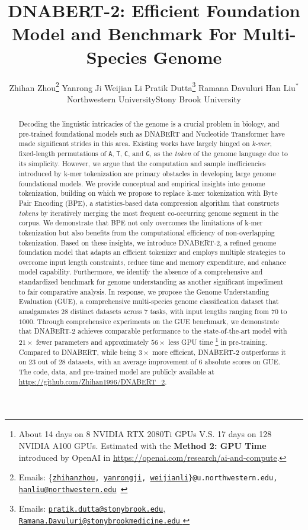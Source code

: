 \documentclass{article}
\title{DNABERT-2: Efficient Foundation Model and Benchmark For Multi-Species Genome}
\author{
  Zhihan Zhou\thanks{Emails: {\{\tt \href{mailto:zhihanzhou@u.northwestern.edu}{zhihanzhou},  \href{mailto:yanrongji2021@u.northwestern.edu}{yanrongji},    \href{mailto:weijianli@u.northwestern.edu}{weijianli}\}@u.northwestern.edu, \href{mailto:hanliu@northwestern.edu}{\texttt{hanliu@northwestern.edu}}
  }}
  \quad 
  Yanrong Ji\footnotemark[1]
  \quad
  Weijian Li\footnotemark[1]
  \quad
  Pratik Dutta\thanks{Emails: \href{mailto:pratik.dutta@stonybrook.edu}{\texttt{pratik.dutta@stonybrook.edu}, \quad \href{mailto:Ramana.Davuluri@stonybrookmedicine.edu}{\texttt{Ramana.Davuluri@stonybrookmedicine.edu}
  }}}
  \quad
  Ramana Davuluri\footnotemark[2]
  \quad
  Han Liu$^*$\\[2mm]
  Northwestern University\footnotemark[1] \qquad Stony Brook University\footnotemark[2]
}
\begin{document}
\maketitle
\setcounter{footnote}{0}  



\begin{abstract}
Decoding the linguistic intricacies  of the genome is a crucial problem in biology, and pre-trained foundational models such as DNABERT and Nucleotide Transformer have made significant strides in this area. Existing works have largely hinged on \textit{k-mer}, fixed-length permutations of \texttt{A}, \texttt{T}, \texttt{C}, and \texttt{G}, as the \textit{token} of the genome language due to its simplicity. However, we argue that the computation and sample inefficiencies introduced by k-mer tokenization are primary obstacles in developing large genome foundational models. We provide conceptual and empirical insights into genome tokenization, building on which we propose to replace k-mer tokenization with Byte Pair Encoding (BPE), a statistics-based data compression algorithm that constructs \textit{tokens} by iteratively merging the most frequent co-occurring genome segment in the corpus. We demonstrate that BPE not only overcomes the limitations of k-mer tokenization but also benefits from the computational efficiency of non-overlapping tokenization.
Based on these insights, we introduce DNABERT-2, a refined genome foundation model that adapts an efficient tokenizer and employs multiple strategies to overcome input length constraints, reduce time and memory expenditure, and enhance model capability. Furthermore, we identify the absence of a comprehensive and standardized benchmark for genome understanding as another significant impediment to fair comparative analysis. In response, we propose the Genome Understanding Evaluation (GUE), a comprehensive multi-species genome classification dataset that amalgamates $28$ distinct datasets across $7$ tasks, with input lengths ranging from $70$ to $1000$. Through comprehensive experiments on the GUE benchmark, we demonstrate that DNABERT-2 achieves comparable performance to the state-of-the-art model with $21 \times$ fewer parameters and approximately $56 \times$ less GPU time \footnote{About 14 days on 8 NVIDIA RTX 2080Ti GPUs V.S. 17 days on 128 NVIDIA A100 GPUs. Estimated with the \textbf{Method 2: GPU Time} introduced by OpenAI in \url{https://openai.com/research/ai-and-compute}.} in pre-training. 
Compared to DNABERT, while being $3 \times$ more efficient, DNABERT-2 outperforms it on $23$ out of $28$ datasets, with an average improvement of $6$ absolute scores on GUE.
The code, data, and pre-trained model are publicly available at \url{https://github.com/Zhihan1996/DNABERT_2}. 

\end{abstract}
\end{document}
